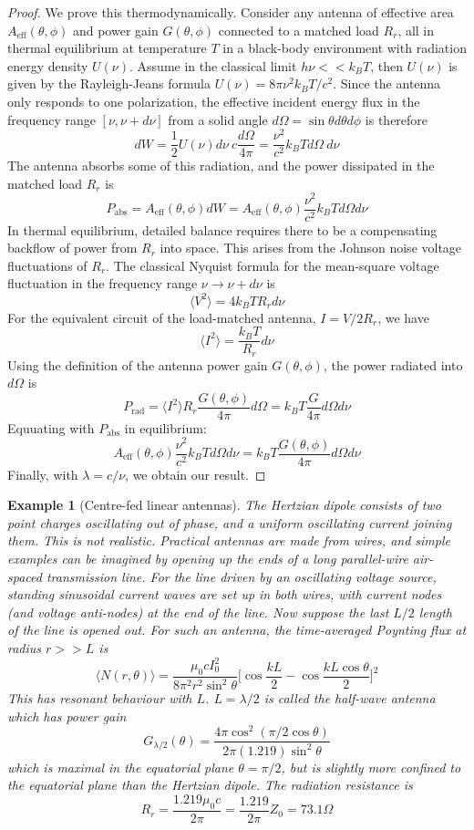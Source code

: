 \documentclass[a4paper]{article}
\newtheorem{eg}{Example}[section]
\theoremstyle{new}
\begin{document}
\begin{proof}
We prove this thermodynamically. Consider any antenna of effective area $A_{\text{eff}}(\theta,\phi)$ and power gain $G(\theta,\phi)$ connected to a matched load $R_r$, all in thermal equilibrium at temperature $T$ in a black-body environment with radiation energy density $U(\nu)$. Assume in the classical limit $h\nu<<k_BT$, then $U(\nu)$ is given by the Rayleigh-Jeans formula $U(\nu)=8\pi\nu^2k_BT/c^2$. Since the antenna only responds to one polarization, the effective incident energy flux in the frequency range $[\nu,\nu+d\nu]$ from a solid angle $d\Omega=\sin\theta d\theta d\phi$ is therefore
$$dW=\frac{1}{2}U(\nu)d\nu~c\frac{d\Omega}{4\pi}=\frac{\nu^2}{c^2}k_BTd\Omega~d\nu$$
The antenna absorbs some of this radiation, and the power dissipated in the matched load $R_r$ is
$$P_{\text{abs}}=A_{\text{eff}}(\theta,\phi)dW=A_{\text{eff}}(\theta,\phi)\frac{\nu^2}{c^2}k_BTd\Omega d\nu$$
In thermal equilibrium, detailed balance requires there to be a compensating backflow of power from $R_r$ into space. This arises from the Johnson noise voltage fluctuations of $R_r$. The classical Nyquist formula for the mean-square voltage fluctuation in the frequency range $\nu\rightarrow\nu+d\nu$ is
$$\langle V^2\rangle=4k_BTR_rd\nu$$
For the equivalent circuit of the load-matched antenna, $I=V/2R_r$, we have
$$\langle I^2\rangle=\frac{k_BT}{R_r}d\nu$$
Using the definition of the antenna power gain $G(\theta,\phi)$, the power radiated into $d\Omega$ is
$$P_{\text{rad}}=\langle I^2\rangle R_r\frac{G(\theta,\phi)}{4\pi}d\Omega=k_BT\frac{G}{4\pi}d\Omega d\nu$$
Equuating with $P_{\text{abs}}$ in equilibrium:
$$A_{\text{eff}}(\theta,\phi)\frac{\nu^2}{c^2}k_BTd\Omega d\nu=k_BT\frac{G(\theta,\phi)}{4\pi}d\Omega d\nu$$
Finally, with $\lambda=c/\nu$, we obtain our result.
\end{proof}
\begin{eg}[Centre-fed linear antennas]
The Hertzian dipole consists of two point charges oscillating out of phase, and a uniform oscillating current joining them. This is not realistic. Practical antennas are made from wires, and simple examples can be imagined by opening up the ends of a long parallel-wire air-spaced transmission line. For the line driven by an oscillating voltage source, standing sinusoidal current waves are set up in both wires, with current nodes (and voltage anti-nodes) at the end of the line. Now suppose the last $L/2$ length of the line is opened out. For such an antenna, the time-averaged Poynting flux at radius $r>>L$ is
$$\langle N(r,\theta)\rangle=\frac{\mu_0cI_0^2}{8\pi^2r^2\sin^2\theta}\bigg[\cos\frac{kL}{2}-\cos\frac{kL\cos\theta}{2}\bigg]^2$$
This has resonant behaviour with $L$. $L=\lambda/2$ is called the half-wave antenna which has power gain
$$G_{\lambda/2}(\theta)=\frac{4\pi\cos^2(\pi/2\cos\theta)}{2\pi(1.219)\sin^2\theta}$$
which is maximal in the equatorial plane $\theta=\pi/2$, but is slightly more confined to the equatorial plane than the Hertzian dipole. The radiation resistance is
$$R_r=\frac{1.219\mu_0c}{2\pi}=\frac{1.219}{2\pi}Z_0=73.1\Omega$$
\end{eg}
\end{document}
